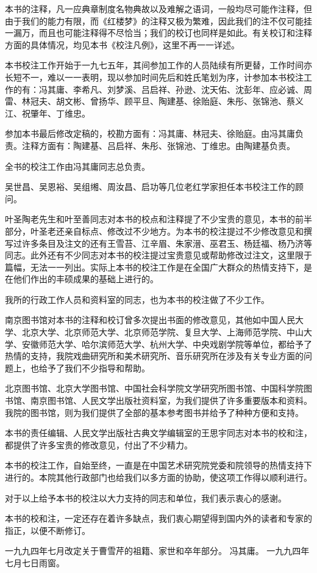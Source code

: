 \par 本书的注释，凡一应典章制度名物典故以及难解之语词，一般均尽可能作注释，但由于我们的能力有限，而《红楼梦》的注释又极为繁难，因此我们的注不仅可能挂一漏万，而且也可能注释得不尽恰当；我们的校订也同样是如此。有关校订和注释方面的具体情况，均见本书《校注凡例》，这里不再一一详述。
\par 本书校注工作开始于一九七五年，其间参加工作的人员陆续有所更替，工作时间亦长短不一，难以一一表明，现以参加时间先后和姓氏笔划为序，计参加本书校注工作的有：冯其庸、李希凡、刘梦溪、吕启祥、孙逊、沈天佑、沈彭年、应必诚、周雷、林冠夫、胡文彬、曾扬华、顾平旦、陶建基、徐贻庭、朱彤、张锦池、蔡义江、祝肇年、丁维忠。
\par 参加本书最后修改定稿的，校勘方面有：冯其庸、林冠夫、徐贻庭。由冯其庸负责。注释方面有：陶建基、吕启祥、朱彤、张锦池、丁维忠。由陶建基负责。
\par 全书的校注工作由冯其庸同志总负责。
\par 吴世昌、吴恩裕、吴组缃、周汝昌、启功等几位老红学家担任本书校注工作的顾问。
\par 叶圣陶老先生和叶至善同志对本书的校点和注释提了不少宝贵的意见，本书的前半部分，叶圣老还亲自标点、修改过不少地方。为本书的校注提过不少修改意见和撰写过许多条目及注文的还有王雪苔、江辛眉、朱家溍、巫君玉、杨廷福、杨乃济等同志。此外还有不少同志对本书的校注提过宝贵意见或帮助修改过注文，这里限于篇幅，无法一一列出。实际上本书的校注工作是在全国广大群众的热情支持下，是在他们作出的丰硕成果的基础上进行的。
\par 我所的行政工作人员和资料室的同志，也为本书的校注做了不少工作。
\par 南京图书馆对本书的注释和校订曾多次提出书面的修改意见，其他如中国人民大学、北京大学、北京师范大学、北京师范学院、复旦大学、上海师范学院、中山大学、安徽师范大学、哈尔滨师范大学、杭州大学、中央戏剧学院等单位，都给予了热情的支持，我院戏曲研究所和美术研究所、音乐研究所在涉及有关专业方面的问题上，也给予了我们不少指导和帮助。
\par 北京图书馆、北京大学图书馆、中国社会科学院文学研究所图书馆、中国科学院图书馆、南京图书馆、人民文学出版社资料室，为我们提供了许多重要版本和资料。我院的图书馆，则为我们提供了全部的基本参考图书并给予了种种方便和支持。
\par 本书的责任编辑、人民文学出版社古典文学编辑室的王思宇同志对本书的校和注，都提供了许多宝贵的修改意见，付出了不少精力。
\par 本书的校注工作，自始至终，一直是在中国艺术研究院党委和院领导的热情支持下进行的。本院其他行政部门也给我们以多方面的协助，使这项工作得以顺利进行。
\par 对于以上给予本书的校注以大力支持的同志和单位，我们表示衷心的感谢。
\par 本书的校和注，一定还存在着许多缺点，我们衷心期望得到国内外的读者和专家的指正，以便不断修订。
\par {}
\par {}
\par 一九九四年七月改定关于曹雪芹的祖籍、家世和卒年部分。 冯其庸。 一九九四年七月七日雨窗。

